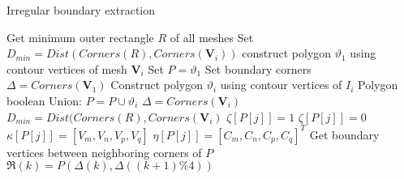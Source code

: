 \documentclass[10pt,journal,compsoc]{IEEEtran}
\begin{document}

\begin{algorithm}
 \label{alg:irregular_boundary}
     \caption{Irregular boundary extraction}
        Get minimum outer rectangle $R$ of all meshes\;
        Set $D_{min} = Dist(Corners(R), Corners(\mathbf{V}_i))$\;
        construct polygon $\vartheta_1$ using contour vertices of mesh $\mathbf{V}_i$\;
        Set $P=\vartheta_1$\;
        Set boundary corners $\Delta= Corners(\mathbf{V}_1)$\;
        {
            Construct polygon $\vartheta_i$ using contour vertices of $I_i$\;
            Polygon boolean Union: $P=P\cup\vartheta_i$\;
            {
                    $\Delta = Corners(\mathbf{V}_i)$\;
                    $D_{min}=Dist(Corners(R), Corners(\mathbf{V}_i)$\;
            }
        }
        {
             {
                 $\zeta[P[j]]=1$\;
             }
             {
                 $\zeta[P[j]]=0$\;
                 $\kappa[P[j]]=[V_m,V_n,V_p,V_q]$\;
                 $\eta[P[j]]=[C_m,C_n,C_p,C_q]^T$\;
             }
        }
       Get boundary vertices between neighboring corners of $P$\;
         {
                 $\Re(k)=P(\Delta(k),\Delta((k+1)\%4))$\;
         }
\end{algorithm}

\begin{comment}
\begin{figure}[t] %
  \centering
  \texttt{[image: polybool]}

  \caption{Flowchart of irregular Pipeline of \emph{StereoPasting}. In the preprocessing step, we first select and triangulate the 2D foreground, then estimate the disparity map of the target scene. After that we edit the disparity map of the 2D foreground by painting strokes and blend it with the 3D background for depth-consistent composition. At last, the 2D foreground is warped and blended into the target image pair to get the composition results.} \label{fig:polybool}
\end{figure}

\begin{comment}
\begin{figure}[t] %
  \centering
  \texttt{[image: polybool2]}

  \caption{A challenging example of irregular boundary construction.} \label{fig:polybool2}
\end{figure}
\end{comment}
\end{document}
